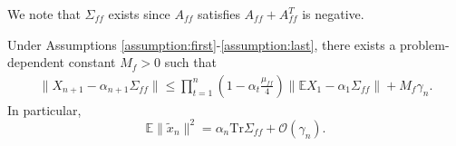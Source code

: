 We note that $\Sigma_{ff}$ exists since $A_{ff}$ satisfies $A_{ff} + A_{ff}^T$ is negative. 
\begin{lemma}\label{lem:fast_mse}
Under Assumptions \ref{assumption:first}-\ref{assumption:last}, there exists a problem-dependent constant $M_f > 0$ such that 
    \begin{align*}
        \lVert X_{n+1} - \alpha_{n+1} \Sigma_{ff}\rVert \leq 
        \prod_{t=1}^n \left(1 - \alpha_t \frac{\mu_{ff}}{4}\right) \lVert \mathbb{E} X_1 - \alpha_1 \Sigma_{ff} \rVert + M_f \gamma_{n} .
    \end{align*}
    In particular,
    \begin{equation}    
        \mathbb{E} \lVert \tilde{x}_n \rVert^2 
        = \alpha_n \mathrm{Tr} \Sigma_{ff} + \mathcal{O}\left( \gamma_n \right) . 
    \end{equation}
\end{lemma}


